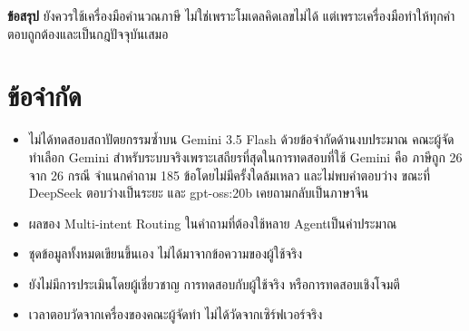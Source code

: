 \documentclass[12pt,a4paper]{article}
\begin{document}
\begin{takeaway}
\textbf{ข้อสรุป} \quad ยังควรใช้เครื่องมือคำนวณภาษี ไม่ใช่เพราะโมเดลคิดเลขไม่ได้ แต่เพราะเครื่องมือทำให้ทุกคำตอบถูกต้องและเป็นกฎปัจจุบันเสมอ
\end{takeaway}

\section{ข้อจำกัด}

\begin{itemize}
\item ไม่ได้ทดสอบสถาปัตยกรรมซ้ำบน Gemini 3.5 Flash ด้วยข้อจำกัดด้านงบประมาณ คณะผู้จัดทำเลือก Gemini สำหรับระบบจริงเพราะเสถียรที่สุดในการทดสอบที่ใช้ Gemini คือ ภาษีถูก 26 จาก 26 กรณี จำแนกคำถาม 185 ข้อโดยไม่มีครั้งใดล้มเหลว และไม่พบคำตอบว่าง ขณะที่ DeepSeek ตอบว่างเป็นระยะ และ gpt-oss:20b เคยถามกลับเป็นภาษาจีน
\item ผลของ Multi-intent Routing ในคำถามที่ต้องใช้หลาย Agentเป็นค่าประมาณ
\item ชุดข้อมูลทั้งหมดเขียนขึ้นเอง ไม่ได้มาจากข้อความของผู้ใช้จริง
\item ยังไม่มีการประเมินโดยผู้เชี่ยวชาญ การทดสอบกับผู้ใช้จริง หรือการทดสอบเชิงโจมตี
\item เวลาตอบวัดจากเครื่องของคณะผู้จัดทำ ไม่ได้วัดจากเซิร์ฟเวอร์จริง
\end{itemize}
\end{document}
